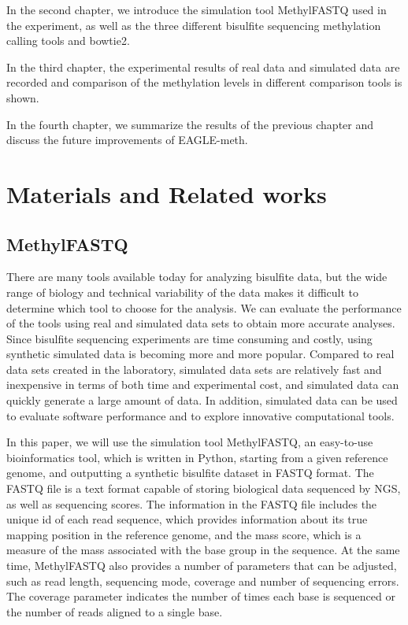 \documentclass{PHlab-thesis}
\begin{document}
In the second chapter, we introduce the simulation tool MethylFASTQ used in the experiment, as well as the three different bisulfite sequencing methylation calling tools and bowtie2.

In the third chapter, the experimental results of real data and simulated data are recorded and comparison of the methylation levels in different comparison tools is shown.

In the fourth chapter, we summarize the results of the previous chapter and discuss the future improvements of EAGLE-meth.


\chapter{Materials and Related works}

\section{MethylFASTQ}
There are many tools available today for analyzing bisulfite data, but the wide range of biology and technical variability of the data makes it difficult to determine which tool to choose for the analysis. We can evaluate the performance of the tools using real and simulated data sets to obtain more accurate analyses. Since bisulfite sequencing experiments are time consuming and costly, using synthetic simulated data is becoming more and more popular. Compared to real data sets created in the laboratory, simulated data sets are relatively fast and inexpensive in terms of both time and experimental cost, and simulated data can quickly generate a large amount of data. In addition, simulated data can be used to evaluate software performance and to explore innovative computational tools.

In this paper, we will use the simulation tool MethylFASTQ\cite{piaggeschi2019methylfastq}, an easy-to-use bioinformatics tool, which is written in Python, starting from a given reference genome, and outputting a synthetic bisulfite dataset in FASTQ format.  The FASTQ file is a text format capable of storing biological data sequenced by NGS, as well as sequencing scores.  The information in the FASTQ file includes the unique id of each read sequence, which provides information about its true mapping position in the reference genome, and the mass score, which is a measure of the mass associated with the base group in the sequence. At the same time, MethylFASTQ also provides a number of parameters that can be adjusted, such as read length, sequencing mode, coverage and number of sequencing errors. The coverage parameter indicates the number of times each base is sequenced or the number of reads aligned to a single base.
\end{document}

